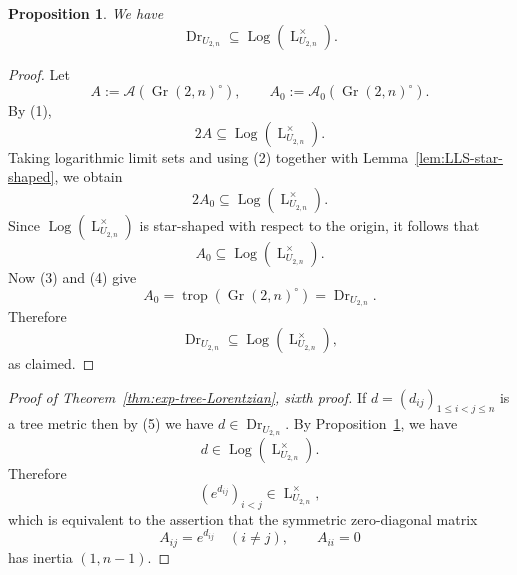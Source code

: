 \documentclass[12pt]{amsart}
\newtheorem{proposition}[theorem]{Proposition}
\theoremstyle{definition}
\newtheorem{remark}[theorem]{Remark}
\newcommand{\1}{\mathbf{1}}
\DeclareMathOperator{\upL}{L}   %
\DeclareMathOperator{\Gr}{Gr}
\begin{document}
\begin{proposition}
\label{prop:tropical-Dressian-inclusion}
We have
\[
\operatorname{Dr}_{U_{2,n}}
\subseteq
\operatorname{Log}(\upL_{U_{2,n}}^\times).
\]
\end{proposition}

\begin{proof}
Let
\[
A:=\mathcal A(\Gr(2,n)^\circ),
\qquad
A_0:=\mathcal A_0(\Gr(2,n)^\circ).
\]
By (1),
\[
2A\subseteq \operatorname{Log}(\upL_{U_{2,n}}^\times).
\]
Taking logarithmic limit sets and using (2) together with
Lemma~\ref{lem:LLS-star-shaped}, we obtain
\[
2A_0\subseteq \operatorname{Log}(\upL_{U_{2,n}}^\times).
\]
Since $\operatorname{Log}(\upL_{U_{2,n}}^\times)$ is star-shaped with respect to the
origin, it follows that
\[
A_0\subseteq \operatorname{Log}(\upL_{U_{2,n}}^\times).
\]
Now (3) and (4) give
\[
A_0
=
\operatorname{trop}(\Gr(2,n)^\circ)
=
\operatorname{Dr}_{U_{2,n}}.
\]
Therefore
\[
\operatorname{Dr}_{U_{2,n}}
\subseteq
\operatorname{Log}(\upL_{U_{2,n}}^\times),
\]
as claimed.
\end{proof}

\begin{proof}[Proof of Theorem~\ref{thm:exp-tree-Lorentzian}, sixth proof]
If $d=(d_{ij})_{1\le i<j\le n}$ is a tree metric then by (5) we have
$d\in \operatorname{Dr}_{U_{2,n}}$.
By Proposition~\ref{prop:tropical-Dressian-inclusion}, we have
\[
d\in \operatorname{Log}(\upL_{U_{2,n}}^\times).
\]
Therefore
\[
(e^{d_{ij}})_{i<j}\in \upL_{U_{2,n}}^\times,
\]
which is equivalent to the assertion that the symmetric
zero-diagonal matrix
\[
A_{ij}=e^{d_{ij}}\quad(i\neq j),
\qquad
A_{ii}=0
\]
has inertia $(1,n-1)$.
\end{proof}


\begin{small}
 
 
\end{small}
\end{document}
